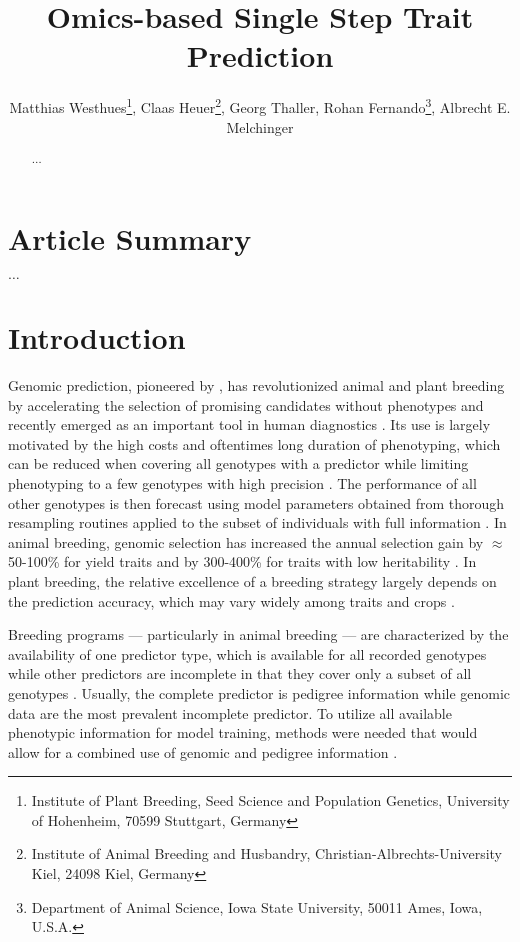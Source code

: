 \documentclass[12pt,titlepage]{article}
\title{Omics-based Single Step Trait Prediction}
\author{
  Matthias Westhues\thanks{Institute of Plant Breeding, Seed Science and Population Genetics, University of Hohenheim, 70599 Stuttgart, Germany},
  Claas Heuer\thanks{Institute of Animal Breeding and Husbandry, Christian-Albrechts-University Kiel, 24098 Kiel, Germany},
  Georg Thaller\samethanks[2],
  Rohan Fernando\thanks{Department of Animal Science, Iowa State University, 50011 Ames, Iowa, U.S.A.},
  Albrecht E. Melchinger\samethanks[1]
}
\begin{document}
\maketitle
\doublespacing
\linenumbers



\begin{abstract}

  $\dots$

\end{abstract}



\section{Article Summary}
$\dots$



\section{Introduction} 
Genomic prediction, pioneered by , has revolutionized
animal and plant breeding by accelerating the selection of promising candidates 
without phenotypes \cite{DeLosCampos2013,Garcia-Ruiz2016} and recently emerged
as an important tool in human diagnostics \cite{DeLosCampos2010,Vazquez2016}.
Its use is largely motivated by the high costs and oftentimes long duration of 
phenotyping, which can be reduced when covering all genotypes with a predictor 
while limiting phenotyping to a few genotypes with high precision
\cite{Kadam2016}.
The performance of all other genotypes is then forecast using model parameters
obtained from thorough resampling routines applied to the subset of individuals 
with full information \cite{Hastie2009}.
In animal breeding, genomic selection has increased the annual selection gain 
by $\approx$ 50-100\% for yield traits and by 300-400\% for traits with low 
heritability \cite{Garcia-Ruiz2016}.
In plant breeding, the relative excellence of a breeding strategy largely 
depends on the prediction accuracy, which may vary widely among traits and 
crops \cite{Longin2015}.

Breeding programs --- particularly in animal breeding --- are characterized by
the availability of one predictor type, which is available for all recorded
genotypes while other predictors are incomplete in that they cover only a 
subset of all genotypes \cite{Fragomeni2015}.
Usually, the complete predictor is pedigree information while genomic data are
the most prevalent incomplete predictor.
To utilize all available phenotypic information for model training, methods were 
needed that would allow for a combined use of genomic and pedigree information 
\cite{Hayes2009a,VanRaden2009}.
\end{document}

